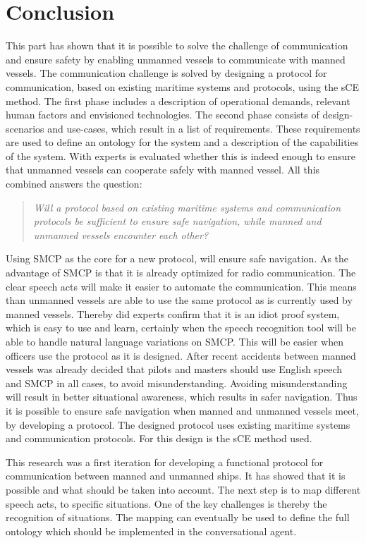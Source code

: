 \chapter{Conclusion}
This part has shown that it is possible to solve the challenge of communication and ensure safety by enabling unmanned vessels to communicate with manned vessels. The communication challenge is solved by designing a protocol for communication, based on existing maritime systems and protocols, using the \acf{sCE} method. The first phase includes a description of operational demands, relevant human factors and envisioned technologies. The second phase consists of design-scenarios and use-cases, which result in a list of requirements. These requirements are used to define an ontology for the system and a description of the capabilities of the system. With experts is evaluated whether this is indeed enough to ensure that unmanned vessels can cooperate safely with manned vessel. All this combined answers the question:

\begin{quotation}
	\emph{Will a protocol based on existing maritime systems and communication protocols be sufficient to ensure safe navigation, while manned and unmanned vessels encounter each other?}
\end{quotation}

Using \acf{SMCP} as the core for a new protocol, will ensure safe navigation. As the advantage of \ac{SMCP} is that it is already optimized for radio communication. The clear speech acts will make it easier to automate the communication. This means than unmanned vessels are able to use the same protocol as is currently used by manned vessels. Thereby did experts confirm that it is an idiot proof system, which is easy to use and learn, certainly when the speech recognition tool will be able to handle natural language variations on \ac{SMCP}.
This will be easier when officers use the protocol as it is designed. After recent accidents between manned vessels was already decided that pilots and masters should use English speech and \ac{SMCP} in all cases, to avoid misunderstanding. Avoiding misunderstanding will result in better situational awareness, which results in safer navigation.
Thus it is possible to ensure safe navigation when manned and unmanned vessels meet, by developing a protocol. The designed protocol uses existing maritime systems and communication protocols. For this design is the \acf{sCE} method used.

This research was a first iteration for developing a functional protocol for communication between manned and unmanned ships. It has showed that it is possible and what should be taken into account. 
The next step is to map different speech acts, to specific situations. One of the key challenges is thereby the recognition of situations. The mapping can eventually be used to define the full ontology which should be implemented in the conversational agent.